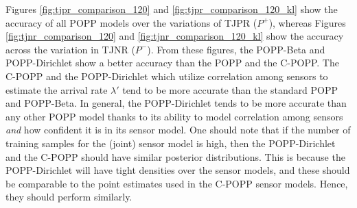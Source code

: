 Figures \ref{fig:tjpr_comparison_120} and \ref{fig:tjpr_comparison_120_kl} show the accuracy of all POPP models over the variations of TJPR ($P^+$), whereas Figures \ref{fig:tjnr_comparison_120} and \ref{fig:tjnr_comparison_120_kl} show the accuracy across the variation in TJNR ($P^-$). From these figures, the POPP-Beta and POPP-Dirichlet show a better accuracy than the POPP and the C-POPP. The C-POPP and the POPP-Dirichlet which utilize correlation among sensors to estimate the arrival rate $\lambda'$ tend to be more accurate than the standard POPP and POPP-Beta.
In general, the POPP-Dirichlet tends to be more accurate than any other POPP model thanks to its ability to model correlation among sensors \emph{and} how confident it is in its sensor model.
One should note that if the number of training samples for the (joint) sensor model is high, then the POPP-Dirichlet and the C-POPP should have similar posterior distributions. This is because the POPP-Dirichlet will have tight densities over the sensor models, and these should be comparable to the point estimates used in the C-POPP  sensor models. Hence, they should perform similarly.
